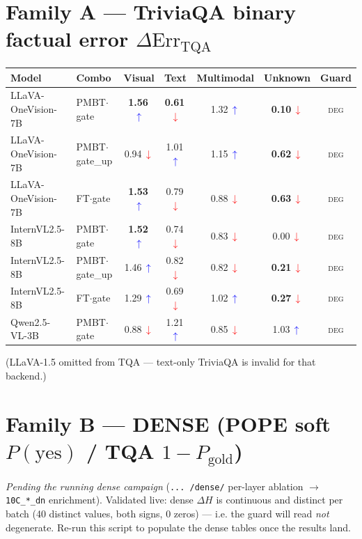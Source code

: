 \documentclass[11pt,a4paper]{article}
\newcommand{\up}{\,\textcolor{blue}{$\uparrow$}}\newcommand{\dn}{\,\textcolor{red}{$\downarrow$}}
\begin{document}
\section*{Family A --- TriviaQA binary factual error $\Delta\mathrm{Err}_{\mathrm{TQA}}$}
\begin{center}\small\begin{tabular}{l l c c c c c}
\toprule Model & Combo & Visual & Text & Multimodal & Unknown & Guard \\ \midrule
LLaVA-OneVision-7B & PMBT$\cdot$gate & \textbf{1.56\up} & \textbf{0.61\dn} & 1.32\up & \textbf{0.10\dn} & \textsc{deg} \\
LLaVA-OneVision-7B & PMBT$\cdot$gate\_up & 0.94\dn & 1.01\up & 1.15\up & \textbf{0.62\dn} & \textsc{deg} \\
LLaVA-OneVision-7B & FT$\cdot$gate & \textbf{1.53\up} & 0.79\dn & 0.88\dn & \textbf{0.63\dn} & \textsc{deg} \\
InternVL2.5-8B & PMBT$\cdot$gate & \textbf{1.52\up} & 0.74\dn & 0.83\dn & 0.00\dn & \textsc{deg} \\
InternVL2.5-8B & PMBT$\cdot$gate\_up & 1.46\up & 0.82\dn & 0.82\dn & \textbf{0.21\dn} & \textsc{deg} \\
InternVL2.5-8B & FT$\cdot$gate & 1.29\up & 0.69\dn & 1.02\up & \textbf{0.27\dn} & \textsc{deg} \\
Qwen2.5-VL-3B & PMBT$\cdot$gate & 0.88\dn & 1.21\up & 0.85\dn & 1.03\up & \textsc{deg} \\
\bottomrule\end{tabular}\end{center}
\noindent\footnotesize(LLaVA-1.5 omitted from TQA --- text-only TriviaQA is invalid for that backend.)\normalsize

\section*{Family B --- DENSE (POPE soft $P(\text{yes})$ / TQA $1-P_{\text{gold}}$)}
\emph{Pending the running dense campaign} (\texttt{...\,/dense/} per-layer ablation
$\to$ \texttt{10C\_*\_dn} enrichment). Validated live: dense $\Delta H$ is
continuous and distinct per batch (40 distinct values, both signs, 0 zeros) ---
i.e. the guard will read \emph{not} degenerate. Re-run this script to populate
the dense tables once the results land.
\end{document}
